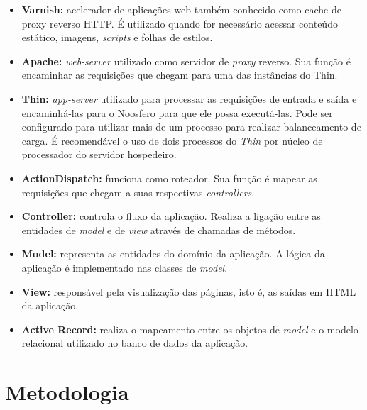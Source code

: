 \documentclass[12pt]{article}
\begin{document}
\begin{itemize}
    \item \textbf{Varnish:} acelerador de aplicações web também conhecido
    como cache de proxy reverso HTTP. É utilizado quando for necessário
    acessar conteúdo estático, imagens, \textit{scripts} e folhas de estilos.

    \item \textbf{Apache:} \textit{web-server} utilizado como servidor de
    \textit{proxy} reverso. Sua função é encaminhar as requisições que
    chegam para uma das instâncias do Thin.

    \item \textbf{Thin:} \textit{app-server} utilizado para processar as
    requisições de entrada e saída e encaminhá-las para o Noosfero para que
    ele possa executá-las. Pode ser configurado para utilizar mais de um
    processo para realizar balanceamento de carga. É recomendável o uso de
    dois processos do \textit{Thin} por núcleo de processador do servidor
    hospedeiro.

    \item \textbf{ActionDispatch:} funciona como roteador. Sua função é
    mapear as requisições que chegam a suas respectivas \textit{controllers}.

    \item \textbf{Controller:} controla o fluxo da aplicação. Realiza a
    ligação entre as entidades de \textit{model} e de \textit{view} através
    de chamadas de métodos.

    \item \textbf{Model:} representa as entidades do domínio da aplicação.
    A lógica da aplicação é implementado nas classes de \textit{model}.

    \item \textbf{View:} responsável pela visualização das páginas, isto é,
    as saídas em HTML da aplicação.

    \item \textbf{Active Record:} realiza o mapeamento entre os objetos de
    \textit{model} e o modelo relacional utilizado no banco de dados da
    aplicação.

\end{itemize}

\section{Metodologia} \label{sec:metodologia}
\end{document}
